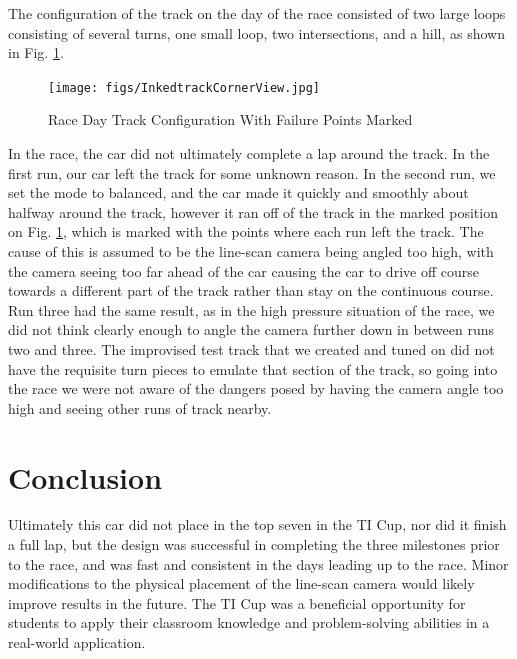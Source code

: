 \documentclass{article}
\begin{document}
The configuration of the track on the day of the race consisted of two large loops consisting of several turns, one small loop, two intersections, and a hill, as shown in Fig. \ref{fig-trackCorner}.

\begin{figure}[htbp]
    \centering
    \texttt{[image: figs/InkedtrackCornerView.jpg]}
    \caption{Race Day Track Configuration With Failure Points Marked \cite{HarrisonTrackPhoto}}
    \label{fig-trackCorner}
\end{figure}

In the race, the car did not ultimately complete a lap around the track. In the first run, our car left the track for some unknown reason. In the second run, we set the mode to balanced, and the car made it quickly and smoothly about halfway around the track, however it ran off of the track in the marked position on Fig. \ref{fig-trackCorner}, which is marked with the points where each run left the track. The cause of this is assumed to be the  line-scan camera being angled too high, with the camera seeing too far ahead of the car causing the car to drive off course towards a different part of the track rather than stay on the continuous course. Run three had the same result, as in the high pressure situation of the race, we did not think clearly enough to angle the camera further down in between runs two and three. The improvised test track that we created and tuned on did not have the requisite turn pieces to emulate that section of the track, so going into the race we were not aware of the dangers posed by having the camera angle too high and seeing other runs of track nearby. 

\section{Conclusion}
\label{sec:conclusion}
Ultimately this car did not place in the top seven in the TI Cup, nor did it finish a full lap,  but the design was successful in completing the three milestones prior to the race, and was fast and consistent in the days leading up to the race. Minor modifications to the physical placement of the line-scan camera would likely improve results in the future. The TI Cup was a beneficial opportunity for students to apply their classroom knowledge and problem-solving abilities in a real-world application.
\end{document}
